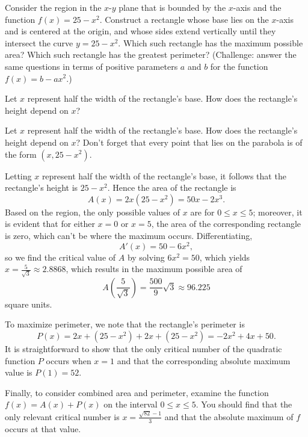 \begin{activity} \label{A:3.4.3}  
Consider the region in the $x$-$y$ plane that is bounded by the $x$-axis and the function $f(x) = 25-x^2$.  Construct a rectangle whose base lies on the $x$-axis and is centered at the origin, and whose sides extend vertically until they intersect the curve $y = 25-x^2$.  Which such rectangle has the maximum possible area?  Which such rectangle has the greatest perimeter?  (Challenge: answer the same questions in terms of positive parameters $a$ and $b$ for the function $f(x) = b-ax^2$.)
\end{activity}
\begin{smallhint}
Let $x$ represent half the width of the rectangle's base.  How does the rectangle's height depend on $x$?
\end{smallhint}
\begin{bighint}
Let $x$ represent half the width of the rectangle's base.  How does the rectangle's height depend on $x$?  Don't forget that every point that lies on the parabola is of the form $(x,25-x^2)$.  
\end{bighint}
\begin{activitySolution}
Letting $x$ represent half the width of the rectangle's base, it follows that the rectangle's height is $25-x^2$.  Hence the area of the rectangle is
$$A(x) = 2x(25-x^2) = 50x - 2x^3.$$ 
Based on the region, the only possible values of $x$ are for $0 \le x \le 5$; moreover, it is evident that for either $x = 0$ or $x = 5$, the area of the corresponding rectangle is zero, which can't be where the maximum occurs.  Differentiating,
$$A'(x) = 50 - 6x^2,$$
so we find the critical value of $A$ by solving $6x^2 = 50$, which yields $x = \frac{5}{\sqrt{3}} \approx 2.8868$, which results in the maximum possible area of 
$$A(\frac{5}{\sqrt{3}}) = \frac{500}{9}\sqrt{3} \approx 96.225$$
square units.

To maximize perimeter, we note that the rectangle's perimeter is 
$$P(x) = 2x + (25-x^2) + 2x + (25 - x^2) = -2x^2 + 4x + 50.$$
It is straightforward to show that the only critical number of the quadratic function $P$ occurs when $x = 1$ and that the corresponding absolute maximum value is $P(1) = 52$.

Finally, to consider combined area and perimeter, examine the function $f(x) = A(x) + P(x)$ on the interval $0 \le x \le 5.$  You should find that the only relevant critical number is $x = \frac{\sqrt{82}-1}{3}$ and that the absolute maximum of $f$ occurs at that value.
\end{activitySolution}
\aftera